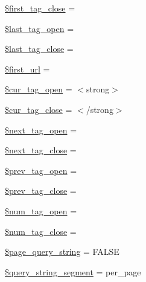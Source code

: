 \begin{DoxyCompactItemize}
\item 
\mbox{\hyperlink{class_c_i___pagination_a1aa5f33d3f661838fa1f8482128a19c7}{\$first\+\_\+tag\+\_\+close}} = \textquotesingle{}\textquotesingle{}
\item 
\mbox{\hyperlink{class_c_i___pagination_ac7e807e8227dd4528c2b315424d126db}{\$last\+\_\+tag\+\_\+open}} = \textquotesingle{}\textquotesingle{}
\item 
\mbox{\hyperlink{class_c_i___pagination_a8e024740710598d97da42739bd231dda}{\$last\+\_\+tag\+\_\+close}} = \textquotesingle{}\textquotesingle{}
\item 
\mbox{\hyperlink{class_c_i___pagination_ac7fe85e2fda76364772be52656e346b8}{\$first\+\_\+url}} = \textquotesingle{}\textquotesingle{}
\item 
\mbox{\hyperlink{class_c_i___pagination_a60f0f6e2515e166fa11657186b39345d}{\$cur\+\_\+tag\+\_\+open}} = \textquotesingle{}$<$strong$>$\textquotesingle{}
\item 
\mbox{\hyperlink{class_c_i___pagination_a8f284fc318c9b1a0d20e5aa53cdbb540}{\$cur\+\_\+tag\+\_\+close}} = \textquotesingle{}$<$/strong$>$\textquotesingle{}
\item 
\mbox{\hyperlink{class_c_i___pagination_a0345e4646ae630d4d95f98de048e4572}{\$next\+\_\+tag\+\_\+open}} = \textquotesingle{}\textquotesingle{}
\item 
\mbox{\hyperlink{class_c_i___pagination_aa3dc112ae0edd3eb76d13eb3f5a57d02}{\$next\+\_\+tag\+\_\+close}} = \textquotesingle{}\textquotesingle{}
\item 
\mbox{\hyperlink{class_c_i___pagination_ab8f96d2bdfd51057db368d8ffd57ca5c}{\$prev\+\_\+tag\+\_\+open}} = \textquotesingle{}\textquotesingle{}
\item 
\mbox{\hyperlink{class_c_i___pagination_abb46001ebebf96f2562ea1f8ced80aa1}{\$prev\+\_\+tag\+\_\+close}} = \textquotesingle{}\textquotesingle{}
\item 
\mbox{\hyperlink{class_c_i___pagination_a1227a094532251dca78e533d9b9f068f}{\$num\+\_\+tag\+\_\+open}} = \textquotesingle{}\textquotesingle{}
\item 
\mbox{\hyperlink{class_c_i___pagination_ab84030017256e7345316413cfefd41a5}{\$num\+\_\+tag\+\_\+close}} = \textquotesingle{}\textquotesingle{}
\item 
\mbox{\hyperlink{class_c_i___pagination_a2721bf5c6a50b356b53f1c1bdb9d139e}{\$page\+\_\+query\+\_\+string}} = F\+A\+L\+SE
\item 
\mbox{\hyperlink{class_c_i___pagination_a8fe6ddd39110b4952ddcca9bba07c019}{\$query\+\_\+string\+\_\+segment}} = \textquotesingle{}per\+\_\+page\textquotesingle{}

\end{DoxyCompactItemize}
